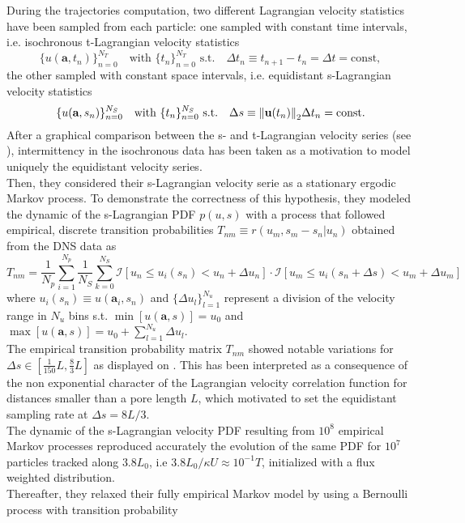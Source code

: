During the trajectories computation, two different Lagrangian velocity statistics have been sampled from each particle: one sampled with constant time intervals, i.e. isochronous t-Lagrangian velocity statistics
\[
\{u(\textbf{a},t_{n})\}_{n=0}^{N_T}\quad\textrm{with $\{t_n\}_{n=0}^{N_T}$ s.t.}\quad \Delta t_n\equiv t_{n+1}-t_n = \Delta t=\mathrm{const},
\] 
the other sampled with constant space intervals, i.e. equidistant s-Lagrangian velocity statistics
\[\{u(\textbf{a},s_{n})\}_{n=0}^{N_S}\quad\textrm{with $\{t_n\}_{n=0}^{N_S}$ s.t.}\quad \Delta s \equiv\norm{\textbf{u}(t_n)}_2\Delta t_n = \mathrm{const}.
\]
After a graphical comparison between the s- and t-Lagrangian velocity series (see \citet[Fig. 2]{Puyguiraud2019}), intermittency in the isochronous data has been taken as a motivation to model uniquely the equidistant velocity series.\\
Then, they considered their s-Lagrangian velocity serie as a stationary ergodic Markov process. 
To demonstrate the correctness of this hypothesis, they modeled the dynamic of the s-Lagrangian PDF $p(u,s)$ with a process that followed empirical, discrete transition probabilities $T_{nm}\equiv r(u_m,s_m-s_n|u_n)$ obtained from the DNS data as
\[
T_{nm}=\frac{1}{N_p}\sum_{i=1}^{N_p}\frac{1}{N_S}\sum_{k=0}^{N_S}\mathcal{I}[u_n \leq u_i(s_n) < u_n + \Delta u_n]\cdot\mathcal{I}[u_m \leq u_i(s_n+\Delta s) < u_m + \Delta u_m]
\]
where $u_i(s_n)\equiv u(\textbf{a}_i,s_n)$ and $\{\Delta u_l\}_{l=1}^{N_u}$ represent a division of the velocity range in $N_u$ bins s.t. $\min[u(\textbf{a},s)]=u_0$ and $\max[u(\textbf{a},s)]=u_{0}+\sum_{l=1}^{N_u}\Delta u_l$.\\
The empirical transition probability matrix $T_{nm}$ showed notable variations for $\Delta s\in[\frac{1}{150}L,\frac{8}{3}L]$ as displayed on \citet[Fig. 7]{Puyguiraud2019}. 
This has been interpreted as a consequence of the non exponential character of the Lagrangian velocity correlation function for distances smaller than a pore length $L$, which motivated \citeauthor{Puyguiraud2019} to set the equidistant sampling rate at $\Delta s = 8L/3$.\\
The dynamic of the s-Lagrangian velocity PDF resulting from $10^8$ empirical Markov processes reproduced accurately the evolution of the same PDF for $10^7$ particles tracked along $3.8L_0$, i.e $3.8L_0/\kappa U\approx 10^{-1}T$, initialized with a flux weighted distribution.\\
Thereafter, they relaxed their fully empirical Markov model by using a Bernoulli process with transition probability
